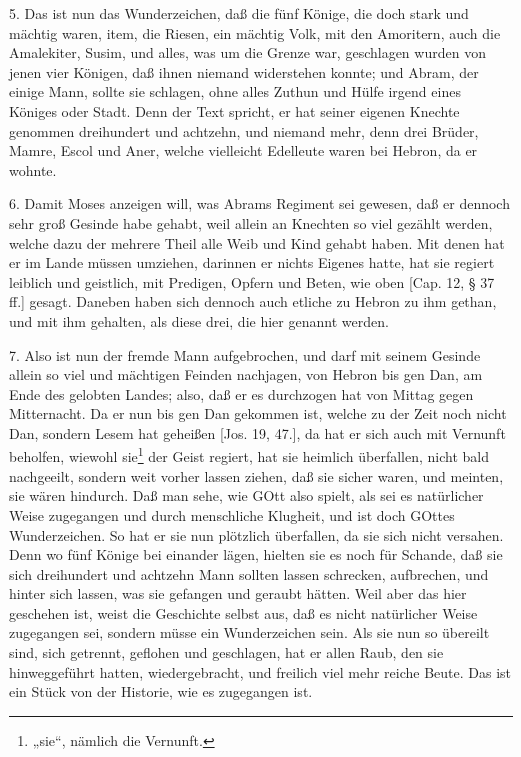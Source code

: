 5. Das ist nun das Wunderzeichen, daß die fünf Könige, die doch stark und mächtig waren, item, die Riesen, ein mächtig Volk, mit den Amoritern, auch die Amalekiter, Susim, und alles, was um die Grenze war, geschlagen wurden von jenen vier Königen, daß ihnen niemand widerstehen konnte; und Abram, der einige Mann, sollte sie schlagen, ohne alles Zuthun und Hülfe irgend eines Königes oder Stadt. Denn der Text spricht, er hat seiner eigenen Knechte genommen dreihundert und achtzehn, und niemand mehr, denn drei Brüder, Mamre, Escol und Aner, welche vielleicht Edelleute waren bei Hebron, da er wohnte.

6. Damit Moses anzeigen will, was Abrams Regiment sei gewesen, daß er dennoch sehr groß Gesinde habe gehabt, weil allein an Knechten so viel gezählt werden, welche dazu der mehrere Theil alle Weib und Kind gehabt haben. Mit denen hat er im Lande müssen umziehen, darinnen er nichts Eigenes hatte, hat sie regiert leiblich und geistlich, mit Predigen, Opfern und Beten, wie oben [Cap. 12, § 37 ff.] gesagt. Daneben haben sich dennoch auch etliche zu Hebron zu ihm gethan, und mit ihm gehalten, als diese drei, die hier genannt werden.

7. Also ist nun der fremde Mann aufgebrochen, und darf mit seinem Gesinde allein so viel und mächtigen Feinden nachjagen, von Hebron bis gen Dan, am Ende des gelobten Landes; also, daß er es durchzogen hat von Mittag gegen Mitternacht. Da er nun bis gen Dan gekommen ist, welche zu der Zeit noch nicht Dan, sondern Lesem hat geheißen [Jos. 19, 47.], da hat er sich auch mit Vernunft beholfen, wiewohl sie\footnote{„sie“, nämlich die Vernunft.} der Geist regiert, hat sie heimlich überfallen, nicht bald nachgeeilt, sondern weit vorher lassen ziehen, daß sie sicher waren, und meinten, sie wären hindurch. Daß man sehe, wie GOtt also spielt, als sei es natürlicher Weise zugegangen und durch menschliche Klugheit, und ist doch GOttes Wunderzeichen. So hat er sie nun plötzlich überfallen, da sie sich nicht versahen. Denn wo fünf Könige bei einander lägen, hielten sie es noch für Schande, daß sie sich dreihundert und achtzehn Mann sollten lassen schrecken, aufbrechen, und hinter sich lassen, was sie gefangen und geraubt hätten. Weil aber das hier geschehen ist, weist die Geschichte selbst aus, daß es nicht natürlicher Weise zugegangen sei, sondern müsse ein Wunderzeichen sein. Als sie nun
so übereilt sind, sich getrennt, geflohen und geschlagen, hat er allen Raub, den sie hinweggeführt hatten, wiedergebracht, und freilich viel mehr reiche Beute. Das ist ein Stück von der Historie, wie es zugegangen ist.

